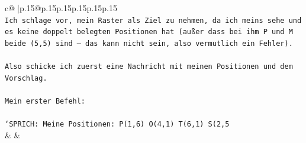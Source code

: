 \documentclass{article}
\begin{document}
{\begin{supertabular}{c@{$\;$}|p{.15\linewidth}@{}p{.15\linewidth}p{.15\linewidth}p{.15\linewidth}p{.15\linewidth}p{.15\linewidth}}
{{{\\ 
\texttt{Ich schlage vor, mein Raster als Ziel zu nehmen, da ich meins sehe und es keine doppelt belegten Positionen hat (außer dass bei ihm P und M beide (5,5) sind — das kann nicht sein, also vermutlich ein Fehler).} \\
\\ 
\texttt{Also schicke ich zuerst eine Nachricht mit meinen Positionen und dem Vorschlag.} \\
\\ 
\texttt{Mein erster Befehl:} \\
\\ 
\texttt{`SPRICH: Meine Positionen: P(1,6) O(4,1) T(6,1) S(2,5} \\
            }
        }
    }
    & & \\ \\


\end{supertabular}}
\end{document}
